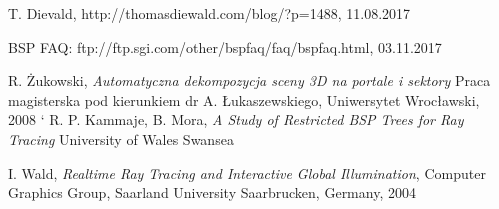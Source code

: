 \documentclass[12pt]{report}
\begin{document}
\begin{thebibliography}{9}
	T. Dievald, http://thomasdiewald.com/blog/?p=1488, 11.08.2017
	
	BSP FAQ: ftp://ftp.sgi.com/other/bspfaq/faq/bspfaq.html, 03.11.2017
	
	R. Żukowski,
	\emph{Automatyczna dekompozycja sceny 3D na portale i sektory}
	Praca magisterska pod kierunkiem dr A. Łukaszewskiego,
	Uniwersytet Wrocławski,
	2008
`	
	R. P. Kammaje, B. Mora,
	\emph{A Study of Restricted BSP Trees for Ray Tracing}
	University of Wales Swansea
	
	I. Wald,
	\emph{Realtime Ray Tracing and Interactive Global Illumination},
	Computer Graphics Group, Saarland University Saarbrucken, Germany,
	2004
	
\end{thebibliography}

\listoffigures
\end{document}
